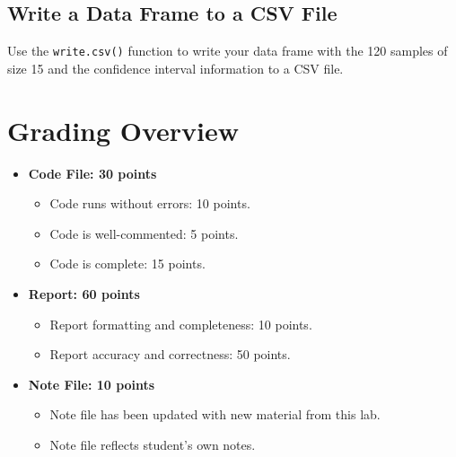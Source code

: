 \documentclass{article}
\begin{document}
\subsection{Write a Data Frame to a CSV File}

Use the \texttt{write.csv()} function to write your data frame with the 120 samples of size 15 and the confidence interval information to a CSV file.



\newpage

\section{Grading Overview}
\begin{itemize}
    \item \textbf{Code File: 30 points}
    \begin{itemize}
        \item Code runs without errors: 10 points.
        \item Code is well-commented: 5 points.
        \item Code is complete: 15 points.
    \end{itemize}
    \item \textbf{Report: 60 points}
    \begin{itemize}
        \item Report formatting and completeness: 10 points.
        \item Report accuracy and correctness: 50 points.
    \end{itemize}
    \item \textbf{Note File: 10 points}
    \begin{itemize}
        \item Note file has been updated with new material from this lab.
        \item Note file reflects student’s own notes.
    \end{itemize}
\end{itemize}
\end{document}
